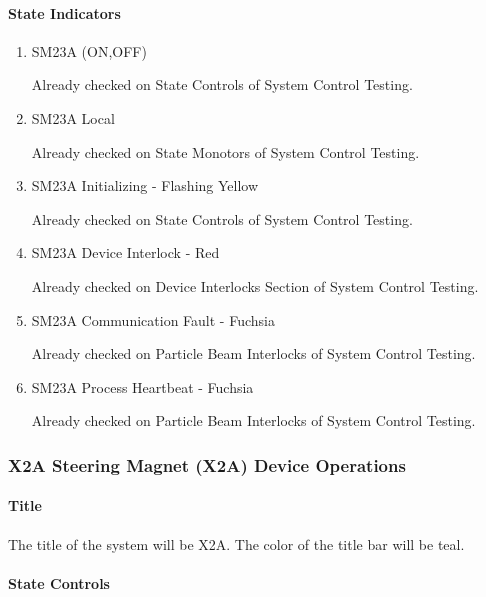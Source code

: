 \documentclass[11pt]{book}		%
\begin{document}
\paragraph{State Indicators}

\begin{enumerate}
 \item SM23A (ON,OFF)

\color{red}
Already checked on State Controls of System Control Testing.
\color{black}

 \item SM23A Local

\color{red}
Already checked on State Monotors of System Control Testing.
\color{black}

 \item SM23A Initializing - Flashing Yellow

\color{red}
Already checked on State Controls of System Control Testing.
\color{black}

 \item SM23A Device Interlock - Red

\color{red}
Already checked on Device Interlocks Section of System Control Testing.
\color{black}

 \item SM23A Communication Fault - Fuchsia

\color{red}
Already checked on Particle Beam Interlocks of System Control Testing.
\color{black}

 \item SM23A Process Heartbeat - Fuchsia

\color{red}
Already checked on Particle Beam Interlocks of System Control Testing.
\color{black}

\end{enumerate}

\subsubsection{X2A Steering Magnet (X2A) Device Operations} \label{sect:cyc-op-interface-ops-terminal-device-ops-x2a}

\paragraph{Title} \label{sect:cyc-op-interface-ops-terminal-device-ops-x2a-title}

The title of the system will be X2A.  The color of the title bar will be teal.

\paragraph{State Controls}
\end{document}
